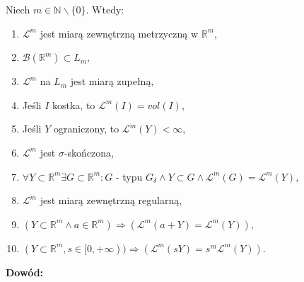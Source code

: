 \begin{tw}
    Niech $m \in \mathbb{N} \backslash \{0\}$. Wtedy:
    \begin{enumerate}
    \item $\mathcal{L}^m$ jest miarą zewnętrzną metrzyczną w $\mathbb{R}^m$,
    \item $\mathcal{B}(\mathbb{R}^m) \subset L_m$,
    \item $\mathcal{L}^m$ na $L_m$ jest miarą zupełną,
    \item Jeśli $I$ kostka, to $\mathcal{L}^m(I) = vol(I)$,
    \item Jeśli $Y$ ograniczony, to $\mathcal{L}^m(Y) < \infty$,
    \item $\mathcal{L}^m$ jest $\sigma$-skończona,
    \item $\forall Y \subset \mathbb{R}^m \exists G \subset \mathbb{R}^m: G$ - typu $G_{\delta} \wedge Y \subset G \wedge \mathcal{L}^m(G) = \mathcal{L}^m(Y)$,
    \item $\mathcal{L}^m$ jest miarą zewnętrzną regularną,
    \item $(Y \subset \mathbb{R}^m \wedge a \in \mathbb{R}^m) \Longrightarrow (\mathcal{L}^m(a + Y) = \mathcal{L}^m(Y))$,
    \item $(Y \subset \mathbb{R}^m, s \in [0, +\infty)) \Longrightarrow (\mathcal{L}^m(sY) = s^m\mathcal{L}^m(Y))$.
    \end{enumerate}

    \textbf{Dowód:} \citep[AM4, 3.41]{Tworzewski}
\end{tw}